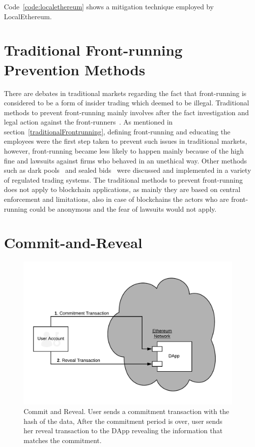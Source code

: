 Code~\ref{code:localethereum} shows a mitigation technique employed by LocalEthereum. \\



\section{Traditional Front-running Prevention Methods} \label{app:traditionalprevention}

There are debates in traditional markets regarding the fact that front-running is considered to be a form of insider trading which deemed to be illegal. Traditional methods to prevent front-running mainly involves after the fact investigation and legal action against the front-runners~\cite{FTFrontrunning18}. As mentioned in section~\ref{traditionalFrontrunning}, defining front-running and educating the employees were the first step taken to prevent such issues in traditional markets, however, front-running became less likely to happen mainly because of the high fine and lawsuits against firms who behaved in an unethical way. Other methods such as dark pools~\cite{zhu2014dark,buti2011diving} and sealed bids~\cite{radner1989sealed} were discussed and implemented in a variety of regulated trading systems. The traditional methods to prevent front-running does not apply to blockchain applications, as mainly they are based on central enforcement and limitations, also in case of blockchains the actors who are front-running could be anonymous and the fear of lawsuits would not apply. 


\section{Commit-and-Reveal} \label{app:cr}

\begin{figure}[!htb]
\centering
\includegraphics[width=0.5\linewidth]{figures/commit-reveal.png}
\caption{\scriptsize Commit and Reveal. User sends a commitment transaction with the hash of the data, After the commitment period is over, user sends her reveal transaction to the DApp revealing the information that matches the commitment. \label{fig:commitReveal}}
\end{figure}

